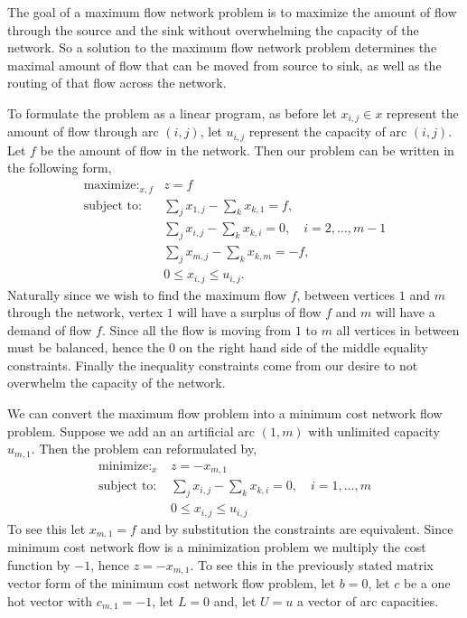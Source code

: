 \documentclass[12pt]{amsart}
\begin{document}
The goal of a maximum flow network problem is to maximize the amount of flow through the source and the sink without overwhelming the capacity of 
the network. So a solution to the maximum flow network problem determines the maximal amount of flow that can be moved from source to sink, as well as the 
routing of that flow across the network. 

To formulate the problem as a linear program, as before let $x_{i, j} \in x$ represent the amount of flow through arc $(i, j)$, let $u_{i, j}$
represent the capacity of arc $(i, j)$. Let $f$ be the amount of flow in the network. Then our problem can be written in the following form, 
\begin{align*}
    \mathop{\text{maximize: }}_{x, f} &z = f\\
    \text{subject to: } &\sum_{j}x_{1, j} - \sum_{k}x_{k, 1} = f,\\
    &\sum_{j}x_{i, j} - \sum_{k}x_{k, i} = 0, \quad i = 2, \dots, m - 1\\
    &\sum_{j}x_{m, j} - \sum_{k}x_{k, m} = -f,\\
    &0 \leq x_{i, j} \leq u_{i, j}.
\end{align*}
Naturally since we wish to find the maximum flow $f$, between vertices $1$ and $m$ through the network, vertex $1$ will have a surplus of flow $f$ and 
$m$ will have a demand of flow $f$. Since all the flow is moving from $1$ to $m$ all vertices in between must be balanced, hence the 0 on the right hand side
of the middle equality constraints. Finally the inequality constraints come from our desire to not overwhelm the capacity of the network. 

We can convert the maximum flow problem into a minimum cost network flow problem. Suppose we add an an artificial arc $(1, m)$ with unlimited 
capacity $u_{m, 1}$. Then the problem can reformulated by, 
\begin{align*}
    \mathop{\text{minimize: }}_{x} &z = -x_{m, 1}\\
    \text{subject to: } &\sum_{j}x_{i, j} - \sum_{k}x_{k, i} = 0, \quad i = 1, \dots, m\\
    &0 \leq x_{i, j} \leq u_{i, j}
\end{align*}
To see this let $x_{m,1} = f$ and by substitution the constraints are equivalent. Since minimum cost network flow is a minimization problem we multiply
the cost function by $-1$, hence $z = -x_{m, 1}$. To see this in the previously stated matrix vector form of the minimum cost network flow problem, let 
$b = 0$, let $c$ be a one hot vector with $c_{m,1} = -1$, let $L = 0$ and, let $U = u$ a vector of arc capacities. 
\end{document}
